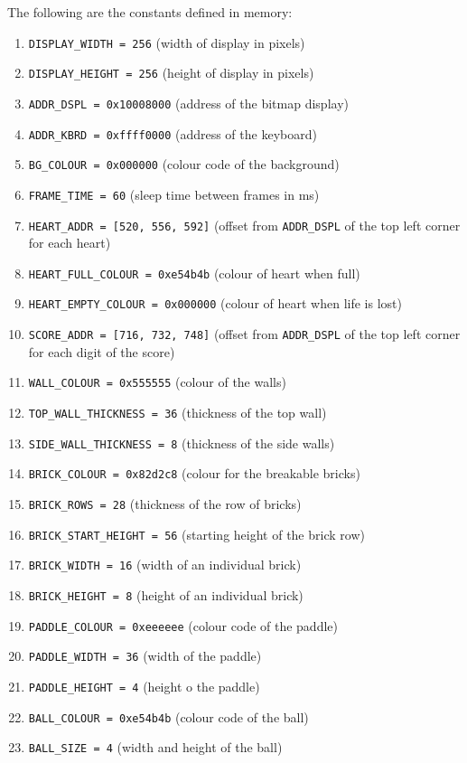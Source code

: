 \documentclass{article}
\begin{document}
The following are the constants defined in memory:
\begin{enumerate}
	\item\texttt{DISPLAY\_WIDTH = 256} (width of display in pixels)
	\item\texttt{DISPLAY\_HEIGHT = 256} (height of display in pixels)
	\item\texttt{ADDR\_DSPL = 0x10008000} (address of the bitmap display)
	\item\texttt{ADDR\_KBRD = 0xffff0000} (address of the keyboard)
	\item\texttt{BG\_COLOUR = 0x000000} (colour code of the background)
	\item\texttt{FRAME\_TIME = 60} (sleep time between frames in ms)
	\item\texttt{HEART\_ADDR = [520, 556, 592]} (offset from \texttt{ADDR\_DSPL} of the top left corner for each heart)
	\item\texttt{HEART\_FULL\_COLOUR = 0xe54b4b} (colour of heart when full)
	\item\texttt{HEART\_EMPTY\_COLOUR = 0x000000} (colour of heart when life is lost)
	\item\texttt{SCORE\_ADDR = [716, 732, 748]} (offset from \texttt{ADDR\_DSPL} of the top left corner for each digit of the score)
	\item\texttt{WALL\_COLOUR = 0x555555} (colour of the walls)
	\item\texttt{TOP\_WALL\_THICKNESS = 36} (thickness of the top wall)
	\item\texttt{SIDE\_WALL\_THICKNESS = 8} (thickness of the side walls)
	\item\texttt{BRICK\_COLOUR = 0x82d2c8} (colour for the breakable bricks)
	\item\texttt{BRICK\_ROWS = 28} (thickness of the row of bricks)
	\item\texttt{BRICK\_START\_HEIGHT = 56} (starting height of the brick row)
	\item\texttt{BRICK\_WIDTH = 16} (width of an individual brick)
	\item\texttt{BRICK\_HEIGHT = 8} (height of an individual brick)
	\item\texttt{PADDLE\_COLOUR = 0xeeeeee} (colour code of the paddle)
	\item\texttt{PADDLE\_WIDTH = 36} (width of the paddle)
	\item\texttt{PADDLE\_HEIGHT = 4} (height o the paddle)
	\item\texttt{BALL\_COLOUR = 0xe54b4b} (colour code of the ball)
	\item\texttt{BALL\_SIZE = 4} (width and height of the ball)
\end{enumerate}
\end{document}
